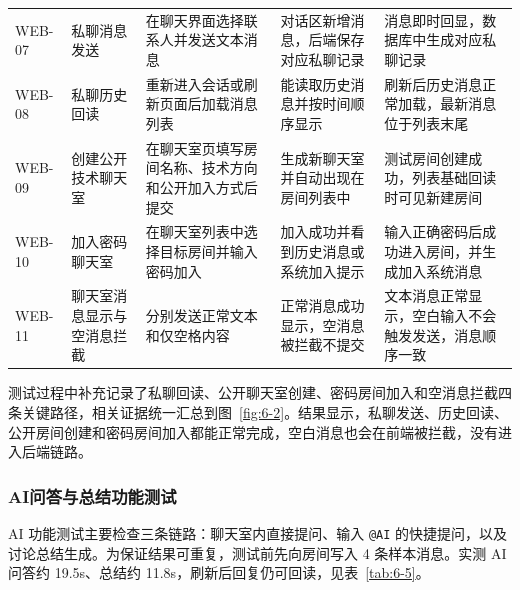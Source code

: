 \renewcommand{\arraystretch}{1.08}
\setlength{\tabcolsep}{0.55ex}
\small
\begin{longtable}{M{0.12\textwidth}p{0.16\textwidth}p{0.18\textwidth}p{0.18\textwidth}p{0.23\textwidth}}
WEB-07 & 私聊消息发送 & 在聊天界面选择联系人并发送文本消息 & 对话区新增消息，后端保存对应私聊记录 & 消息即时回显，数据库中生成对应私聊记录 \\
WEB-08 & 私聊历史回读 & 重新进入会话或刷新页面后加载消息列表 & 能读取历史消息并按时间顺序显示 & 刷新后历史消息正常加载，最新消息位于列表末尾 \\
WEB-09 & 创建公开技术聊天室 & 在聊天室页填写房间名称、技术方向和公开加入方式后提交 & 生成新聊天室并自动出现在房间列表中 & 测试房间创建成功，列表基础回读时可见新建房间 \\
WEB-10 & 加入密码聊天室 & 在聊天室列表中选择目标房间并输入密码加入 & 加入成功并看到历史消息或系统加入提示 & 输入正确密码后成功进入房间，并生成加入系统消息 \\
WEB-11 & 聊天室消息显示与空消息拦截 & 分别发送正常文本和仅空格内容 & 正常消息成功显示，空消息被拦截不提交 & 文本消息正常显示，空白输入不会触发发送，消息顺序一致 \\
\end{longtable}
\normalsize
\FloatBarrier

测试过程中补充记录了私聊回读、公开聊天室创建、密码房间加入和空消息拦截四条关键路径，相关证据统一汇总到图~\ref{fig:6-2}。结果显示，私聊发送、历史回读、公开房间创建和密码房间加入都能正常完成，空白消息也会在前端被拦截，没有进入后端链路。

\subsubsection{AI问答与总结功能测试}

AI 功能测试主要检查三条链路：聊天室内直接提问、输入 \texttt{@AI} 的快捷提问，以及讨论总结生成。为保证结果可重复，测试前先向房间写入 4 条样本消息。实测 AI 问答约 19.5s、总结约 11.8s，刷新后回复仍可回读，见表~\ref{tab:6-5}。

